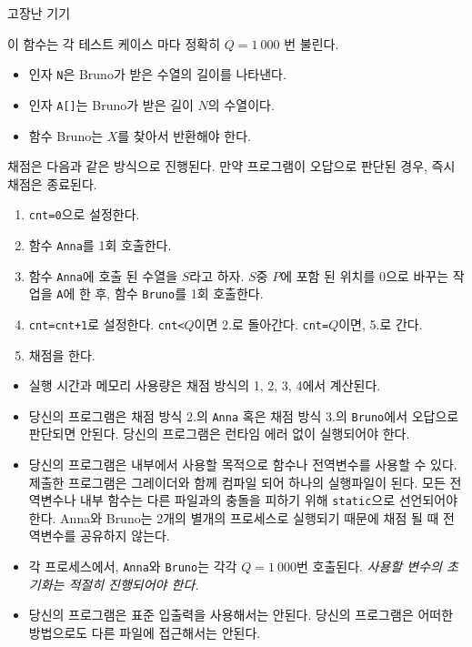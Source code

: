 \begin{problem}{고장난 기기}
\begin{itemize}
		이 함수는 각 테스트 케이스 마다 정확히 $Q = 1\ 000$ 번 불린다.
		\begin{itemize}
			\item 인자 \texttt{N}은 Bruno가 받은 수열의 길이를 나타낸다.
			\item 인자 \texttt{A[]}는 Bruno가 받은 길이 $N$의 수열이다.			\item 함수 Bruno는 $X$를 찾아서 반환해야 한다.
		\end{itemize}
	\end{itemize}

	채점은 다음과 같은 방식으로 진행된다. 만약 프로그램이 오답으로 판단된 경우, 즉시 채점은 종료된다.
	
	\begin{enumerate}
		\item \texttt{cnt=0}으로 설정한다.
		\item 함수 \texttt{Anna}를 1회 호출한다.
		\item 함수 \texttt{Anna}에 호출 된 수열을 $S$라고 하자. $S$중 $P$에 포함 된 위치를 0으로 바꾸는 작업을 \texttt{A}에 한 후, 함수 \texttt{Bruno}를 1회 호출한다.
		\item \texttt{cnt=cnt+1}로 설정한다. \texttt{cnt<}$Q$이면 2.로 돌아간다. \texttt{cnt=}$Q$이면, 5.로 간다.
		\item 채점을 한다.
	\end{enumerate}
	
	\Notes
	
	\begin{itemize}
		\item 실행 시간과 메모리 사용량은 채점 방식의 1, 2, 3, 4에서 계산된다.
		\item 당신의 프로그램은 채점 방식 2.의 \texttt{Anna} 혹은 채점 방식 3.의 \texttt{Bruno}에서 오답으로 판단되면 안된다. 당신의 프로그램은 런타임 에러 없이 실행되어야 한다.
		\item 당신의 프로그램은 내부에서 사용할 목적으로 함수나 전역변수를 사용할 수 있다. 제출한 프로그램은 그레이더와 함께 컴파일 되어 하나의 실행파일이 된다. 모든 전역변수나 내부 함수는 다른 파일과의 충돌을 피하기 위해 \texttt{static}으로 선언되어야 한다. Anna와 Bruno는 2개의 별개의 프로세스로 실행되기 때문에 채점 될 때 전역변수를 공유하지 않는다.
		\item 각 프로세스에서, \texttt{Anna}와 \texttt{Bruno}는 각각 $Q = 1\ 000$번 호출된다. \textit{사용할 변수의 초기화는 적절히 진행되어야 한다.}
		\item 당신의 프로그램은 표준 입출력을 사용해서는 안된다. 당신의 프로그램은 어떠한 방법으로도 다른 파일에 접근해서는 안된다. 
	\end{itemize}
	

\end{problem}
